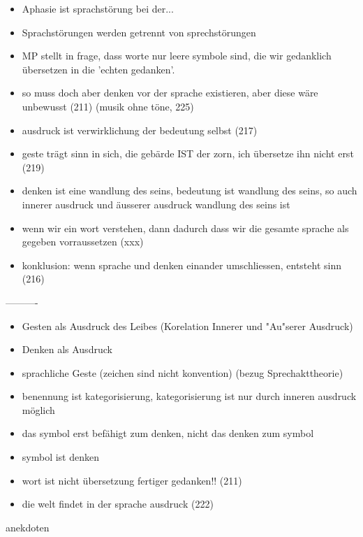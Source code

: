 \documentclass[a4paper, 12pt]{article}
\begin{document}
\begin{onehalfspace}
\begin{itemize}
  \item Aphasie ist sprachstörung bei der...
  \item Sprachstörungen werden getrennt von sprechstörungen
  \item MP stellt in frage, dass worte nur leere symbole sind, die wir gedanklich übersetzen in die 'echten gedanken'.
  \item so muss doch aber denken vor der sprache existieren, aber diese wäre unbewusst (211) (musik ohne töne, 225)
  \item ausdruck ist verwirklichung der bedeutung selbst (217)
  \item geste trägt sinn in sich, die gebärde IST der zorn, ich übersetze ihn nicht erst (219)
  \item denken ist eine wandlung des seins, bedeutung ist wandlung des seins, so auch innerer ausdruck und äusserer ausdruck wandlung des seins ist
  \item wenn wir ein wort verstehen, dann dadurch dass wir die gesamte sprache als gegeben vorraussetzen (xxx)
  \item konklusion: wenn sprache und denken einander umschliessen, entsteht sinn (216)
\end{itemize}

----------

\begin{itemize}
  \item Gesten als Ausdruck des Leibes (Korelation Innerer und "Au"serer Ausdruck)
  \item Denken als Ausdruck
  \item sprachliche Geste (zeichen sind nicht konvention) (bezug Sprechakttheorie)
  \item benennung ist kategorisierung, kategorisierung ist nur durch inneren ausdruck möglich
  \item das symbol erst befähigt zum denken, nicht das denken zum symbol
  \item symbol ist denken
  \item wort ist nicht übersetzung fertiger gedanken!! (211)
  \item die welt findet in der sprache ausdruck (222) 
\end{itemize}



anekdoten


\end{onehalfspace}
\end{document}
